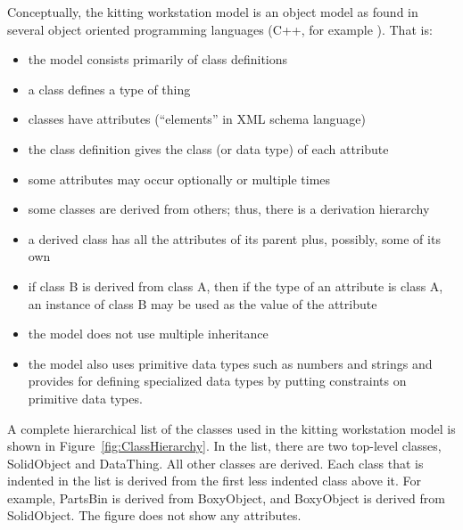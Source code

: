Conceptually, the kitting workstation model is an object model as found in
several object oriented programming languages (C++, for example
\cite{Stroustrup.2000}).  That is:
\begin{itemize}
\item the model consists primarily of class definitions
\item a class defines a type of thing
\item classes have attributes (``elements'' in XML schema language)
\item the class definition gives the class (or data type) of each attribute
\item some attributes may occur optionally or multiple times
\item some classes are derived from others; thus, there is a derivation
 hierarchy
\item a derived class has all the attributes of its parent plus, possibly,
  some of its own
\item if class B is derived from class A, then if the type of an attribute
  is class A, an instance of class B may be used as the value of the attribute
\item the model does not use multiple inheritance
\item the model also uses primitive data types such as numbers and strings
  and provides for defining specialized data types by putting constraints
  on primitive data types.
\end{itemize}

A complete hierarchical list of the classes used in the kitting workstation
model is shown in Figure~\ref{fig:ClassHierarchy}. In the list, there are two
top-level classes, SolidObject and DataThing. All other classes are
derived. Each class that is indented in the list is derived from the first
less indented class above it. For example, PartsBin is derived from
BoxyObject, and BoxyObject is derived from SolidObject. The figure does not
show any attributes.


